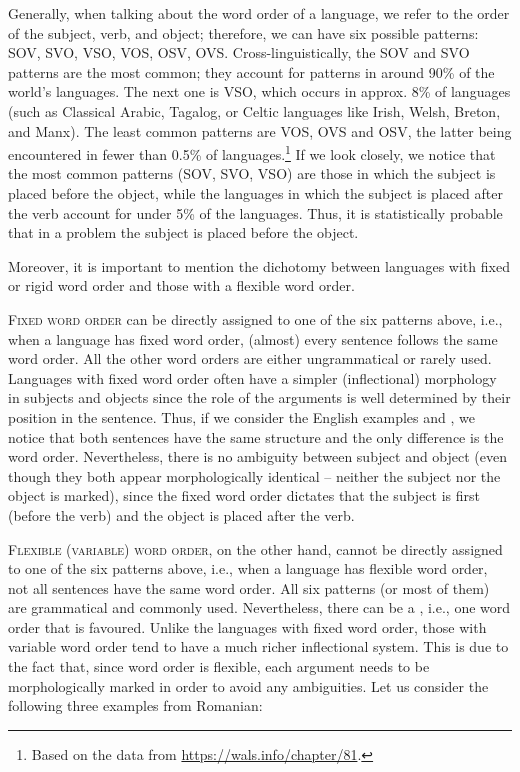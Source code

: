 \begin{refsection}
Generally, when talking about the word order of a language, we refer to the order of the subject, verb, and object; therefore, we can have six possible patterns: SOV, SVO, VSO, VOS, OSV, OVS. Cross-linguistically, the SOV and SVO patterns are the most common; they account for patterns in around 90\% of the world's languages. The next one is VSO, which occurs in approx. 8\% of languages (such as Classical Arabic, Tagalog, or Celtic languages like Irish, Welsh, Breton, and Manx). The least common patterns are VOS, OVS and OSV, the latter being encountered in fewer than 0.5\% of languages.\footnote{Based on the data from \url{https://wals.info/chapter/81}.} If we look closely, we notice that the most common patterns (SOV, SVO, VSO) are those in which the subject is placed before the object, while the languages in which the subject is placed after the verb account for under 5\% of the languages. Thus, it is statistically probable that in a problem the subject is placed before the object.

Moreover, it is important to mention the dichotomy between languages with fixed or rigid word order and those with a flexible word order.

\textsc{Fixed word order} can be directly assigned to one of the six patterns above, i.e., when a language has fixed word order, (almost) every sentence follows the same word order. All the other word orders are either ungrammatical or rarely used. Languages with fixed word order often have a simpler (inflectional) morphology in subjects and objects since the role of the arguments is well determined by their position in the sentence. Thus, if we consider the English examples  and , we notice that both sentences have the same structure and the only difference is the word order. Nevertheless, there is no ambiguity between subject and object (even though they both appear morphologically identical -- neither the subject nor the object is marked), since the fixed word order dictates that the subject is first (before the verb) and the object is placed after the verb.

\textsc{Flexible (variable) word order}, on the other hand, cannot be directly assigned to one of the six patterns above, i.e., when a language has flexible word order, not all sentences have the same word order. All six patterns (or most of them) are grammatical and commonly used. Nevertheless, there can be a , i.e., one word order that is favoured. Unlike the languages with fixed word order, those with variable word order tend to have a much richer inflectional system. This is due to the fact that, since word order is flexible, each argument needs to be morphologically marked in order to avoid any ambiguities. Let us consider the following three examples from Romanian:


\end{refsection}
